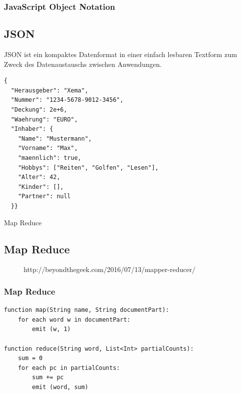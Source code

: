 \documentclass[11pt]{beamer}
\begin{document}
\begin{frame}[fragile]
\frametitle{JavaScript Object Notation}
\subsection{JSON}
JSON ist ein kompaktes Datenformat in einer einfach lesbaren Textform zum Zweck des Datenaustauschs zwischen Anwendungen.


\begin{lstlisting}
{
  "Herausgeber": "Xema",
  "Nummer": "1234-5678-9012-3456",
  "Deckung": 2e+6,
  "Waehrung": "EURO",
  "Inhaber": {
    "Name": "Mustermann",
    "Vorname": "Max",
    "maennlich": true,
    "Hobbys": ["Reiten", "Golfen", "Lesen"],
    "Alter": 42,
    "Kinder": [],
    "Partner": null
  }}
\end{lstlisting}

\end{frame}

\begin{frame}{Map Reduce}
\subsection{Map Reduce}
\begin{figure}
		\caption{http://beyondthegeek.com/2016/07/13/mapper-reducer/}
\end{figure}
\end{frame}

\begin{frame}[fragile]
\frametitle{Map Reduce}
\lstset{
	basicstyle=\footnotesize,
	numbers=left,
	numbersep=5pt,
	showtabs=false,
	title=Wortzahl,
	style=customc
}

\begin{lstlisting}
function map(String name, String documentPart):
	for each word w in documentPart:
		emit (w, 1)
 
function reduce(String word, List<Int> partialCounts):
	sum = 0
	for each pc in partialCounts:
		sum += pc
		emit (word, sum)
		
\end{lstlisting}

\end{frame}
\end{document}
